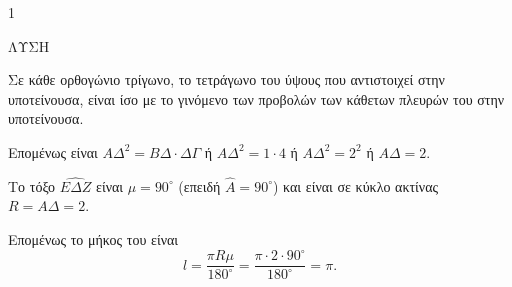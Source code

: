 \begin{ylh}{1}
    \item [Ύλη από εικόνα]
\end{ylh}
ΛΥΣΗ

\begin{alist}
\item Σε κάθε ορθογώνιο τρίγωνο, το τετράγωνο του ύψους που αντιστοιχεί στην υποτείνουσα, είναι ίσο με το γινόμενο των προβολών των κάθετων πλευρών του στην υποτείνουσα.

Επομένως είναι
$A\Delta^2 = B\Delta \cdot \Delta\Gamma$ ή $A\Delta^2 = 1 \cdot 4$ ή $A\Delta^2 = 2^2$ ή $A\Delta = 2$.

\item Το τόξο $\widehat{E\Delta Z}$ είναι $\mu = 90^\circ$ (επειδή $\widehat{A} = 90^\circ$) και είναι σε κύκλο ακτίνας $R = A\Delta = 2$.

Επομένως το μήκος του είναι
\[ l = \frac{\pi R \mu}{180^\circ} = \frac{\pi \cdot 2 \cdot 90^\circ}{180^\circ} = \pi. \]
\end{alist}